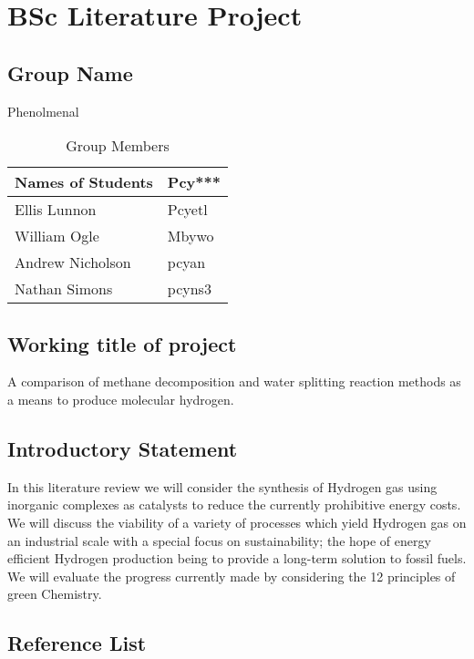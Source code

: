 \documentclass[a4paper]{article}
\begin{document}
	\section*{BSc Literature Project}%
	\label{sec:bsc_literature_project}
	
	\subsection*{Group Name}%
	\label{sub:group_name}
	
	Phenolmenal
	\begin{table}[htpb]
		\centering
		\label{tab:label}
		\begin{tabular}{|l|l|}
		\hline
		Names of Students & Pcy***\\\hline
		Ellis Lunnon & Pcyetl\\\hline
		William Ogle & Mbywo\\\hline
		Andrew Nicholson & pcyan\\\hline
		Nathan Simons & pcyns3\\\hline
		\end{tabular}
		\caption{Group Members}
	\end{table}
	\subsection*{Working title of project}%
	\label{sub:working_title_of_project}
	
	A comparison of methane decomposition and water splitting reaction methods as a means to produce molecular hydrogen.
	
	\subsection*{Introductory Statement}%
	\label{sub:introductory_statement}
	In this literature review we will consider the synthesis of Hydrogen gas using inorganic complexes as catalysts to reduce the currently prohibitive energy costs. We will discuss the viability of a variety of processes which yield Hydrogen gas on an industrial scale with a special focus on sustainability; the hope of energy efficient Hydrogen production being to provide a long-term solution to fossil fuels. We will evaluate the progress currently made by considering the 12 principles of green Chemistry. 
	
	

	\subsection*{Reference List}%
	\label{sub:reference_list}
	
\end{document}

